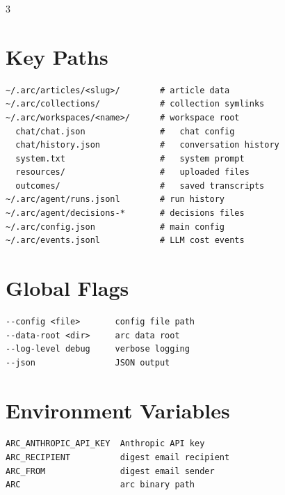 \documentclass[10pt,a4paper,landscape]{article}
\begin{document}
\begin{multicols}{3}
\section{Key Paths}

\begin{lstlisting}
~/.arc/articles/<slug>/        # article data
~/.arc/collections/            # collection symlinks
~/.arc/workspaces/<name>/      # workspace root
  chat/chat.json               #   chat config
  chat/history.json            #   conversation history
  system.txt                   #   system prompt
  resources/                   #   uploaded files
  outcomes/                    #   saved transcripts
~/.arc/agent/runs.jsonl        # run history
~/.arc/agent/decisions-*       # decisions files
~/.arc/config.json             # main config
~/.arc/events.jsonl            # LLM cost events
\end{lstlisting}

\section{Global Flags}

\begin{lstlisting}
--config <file>       config file path
--data-root <dir>     arc data root
--log-level debug     verbose logging
--json                JSON output
\end{lstlisting}

\section{Environment Variables}

\begin{lstlisting}
ARC_ANTHROPIC_API_KEY  Anthropic API key
ARC_RECIPIENT          digest email recipient
ARC_FROM               digest email sender
ARC                    arc binary path
\end{lstlisting}

\end{multicols}
\end{document}
